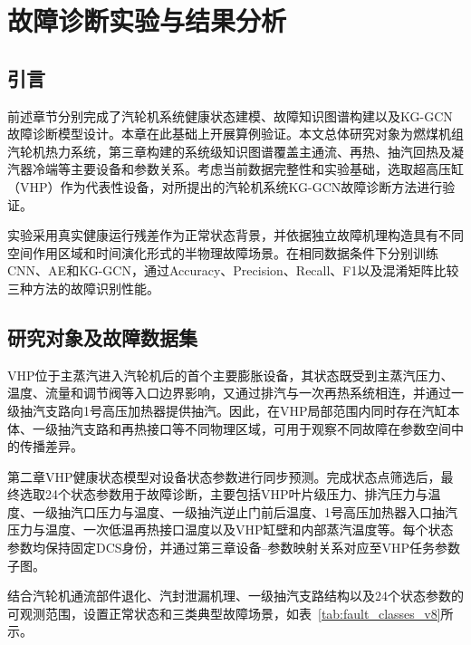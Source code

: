 \section{故障诊断实验与结果分析}
\label{sec:experiments_v8}

\subsection{引言}

前述章节分别完成了汽轮机系统健康状态建模、故障知识图谱构建以及KG-GCN故障诊断模型设计。本章在此基础上开展算例验证。本文总体研究对象为燃煤机组汽轮机热力系统，第三章构建的系统级知识图谱覆盖主通流、再热、抽汽回热及凝汽器冷端等主要设备和参数关系。考虑当前数据完整性和实验基础，选取超高压缸（VHP）作为代表性设备，对所提出的汽轮机系统KG-GCN故障诊断方法进行验证。

实验采用真实健康运行残差作为正常状态背景，并依据独立故障机理构造具有不同空间作用区域和时间演化形式的半物理故障场景。在相同数据条件下分别训练CNN、AE和KG-GCN，通过Accuracy、Precision、Recall、F1以及混淆矩阵比较三种方法的故障识别性能。

\subsection{研究对象及故障数据集}
\label{subsec:fault_dataset_v8}

VHP位于主蒸汽进入汽轮机后的首个主要膨胀设备，其状态既受到主蒸汽压力、温度、流量和调节阀等入口边界影响，又通过排汽与一次再热系统相连，并通过一级抽汽支路向1号高压加热器提供抽汽。因此，在VHP局部范围内同时存在汽缸本体、一级抽汽支路和再热接口等不同物理区域，可用于观察不同故障在参数空间中的传播差异。

第二章VHP健康状态模型对设备状态参数进行同步预测。完成状态点筛选后，最终选取24个状态参数用于故障诊断，主要包括VHP叶片级压力、排汽压力与温度、一级抽汽口压力与温度、一级抽汽逆止门前后温度、1号高压加热器入口抽汽压力与温度、一次低温再热接口温度以及VHP缸壁和内部蒸汽温度等。每个状态参数均保持固定DCS身份，并通过第三章设备--参数映射关系对应至VHP任务参数子图。

结合汽轮机通流部件退化、汽封泄漏机理、一级抽汽支路结构以及24个状态参数的可观测范围，设置正常状态和三类典型故障场景，如表~\ref{tab:fault_classes_v8}所示。

